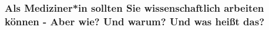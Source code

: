 \documentclass{beamer}
\begin{document}
\begin{frame}
\frametitle{Als Mediziner*in sollten Sie wissenschaftlich arbeiten können - Aber wie? Und warum? Und was heißt das?}

\begin{figure}
    \centering
    \\
    
\end{figure}
\end{frame}



%





 
\end{document}
